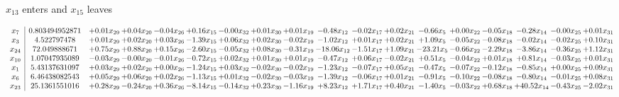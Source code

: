 \documentclass[9pt]{article}
\begin{document}
 $ x_{13} $ enters and $ x_{15} $ leaves 

 \[\begin{array}{c| c c@{\hskip 2pt} c@{\hskip 2pt} c@{\hskip 2pt} c@{\hskip 2pt} c@{\hskip 2pt} c@{\hskip 2pt} c@{\hskip 2pt} c@{\hskip 2pt} c@{\hskip 2pt} c@{\hskip 2pt} c@{\hskip 2pt} c@{\hskip 2pt} c@{\hskip 2pt} c@{\hskip 2pt} c@{\hskip 2pt} c@{\hskip 2pt} }
 x_{7}   &  0.803494952871 & +  0.01 x_{29} & +  0.04 x_{20} & -0.04 x_{26} & +  0.16 x_{15} & -0.00 x_{32} & +  0.01 x_{30} & +  0.01 x_{19} & -0.48 x_{12} & -0.02 x_{17} & +  0.02 x_{21} & -0.66 x_{5} & +  0.00 x_{22} & -0.05 x_{18} & -0.28 x_{14} & -0.00 x_{25} & +  0.01 x_{31}\\
 x_{3}   &  4.522797478 & +  0.01 x_{29} & +  0.02 x_{20} & +  0.03 x_{26} & -1.39 x_{15} & +  0.06 x_{32} & +  0.02 x_{30} & -0.02 x_{19} & -1.02 x_{12} & +  0.01 x_{17} & +  0.02 x_{21} & +  1.09 x_{5} & -0.05 x_{22} & -0.08 x_{18} & -0.02 x_{14} & -0.02 x_{25} & +  0.10 x_{31}\\
 x_{24}   &  72.049888671 & +  0.75 x_{29} & +  0.88 x_{20} & +  0.15 x_{26} & -2.60 x_{15} & -0.05 x_{32} & +  0.08 x_{30} & -0.31 x_{19} & -18.06 x_{12} & -1.51 x_{17} & +  1.09 x_{21} & -23.21 x_{5} & -0.66 x_{22} & -2.29 x_{18} & -3.86 x_{14} & -0.36 x_{25} & +  1.12 x_{31}\\
 x_{10}   &  1.07047935089 & -0.03 x_{29} & -0.00 x_{20} & -0.01 x_{26} & -0.72 x_{15} & +  0.02 x_{32} & +  0.01 x_{30} & +  0.01 x_{19} & -0.47 x_{12} & +  0.06 x_{17} & -0.02 x_{21} & +  0.51 x_{5} & -0.04 x_{22} & +  0.01 x_{18} & +  0.81 x_{14} & -0.03 x_{25} & +  0.01 x_{31}\\
 x_{1}   &  5.43137631097 & +  0.03 x_{29} & +  0.02 x_{20} & +  0.00 x_{26} & -1.24 x_{15} & +  0.03 x_{32} & -0.02 x_{30} & -0.02 x_{19} & -1.23 x_{12} & -0.07 x_{17} & +  0.05 x_{21} & -0.47 x_{5} & -0.07 x_{22} & -0.12 x_{18} & -0.85 x_{14} & +  0.00 x_{25} & +  0.09 x_{31}\\
 x_{6}   &  6.46438082543 & +  0.05 x_{29} & +  0.06 x_{20} & +  0.02 x_{26} & -1.13 x_{15} & +  0.01 x_{32} & -0.02 x_{30} & -0.03 x_{19} & -1.39 x_{12} & -0.06 x_{17} & +  0.01 x_{21} & -0.91 x_{5} & -0.10 x_{22} & -0.08 x_{18} & -0.80 x_{14} & -0.01 x_{25} & +  0.08 x_{31}\\
 x_{23}   &  25.1361551016 & +  0.28 x_{29} & -0.24 x_{20} & +  0.36 x_{26} & -8.14 x_{15} & -0.14 x_{32} & +  0.23 x_{30} & -1.16 x_{19} & +  8.23 x_{12} & +  1.71 x_{17} & +  0.40 x_{21} & -1.40 x_{5} & -0.03 x_{22} & +  0.68 x_{18} & + 40.52 x_{14} & -0.43 x_{25} & -2.02 x_{31}\\

\end{array}\]
\end{document}
